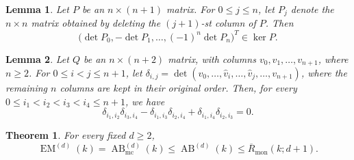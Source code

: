 \documentclass[10pt,a4paper]{amsart}
\newtheorem{theorem}{Theorem}
\newtheorem{lemma}{Lemma}
\begin{document}
\begin{lemma}\label{lem:cramer}
Let $P$ be an $n\times(n+1)$ matrix. For $0\le j\le n$, let $P_j$ denote the
$n\times n$ matrix obtained by deleting the $(j+1)$-st column of $P$. Then
\[
\bigl(\det P_0,-\det P_1,\ldots,(-1)^n\det P_n\bigr)^T\in \ker P.
\]
\end{lemma}

\begin{lemma}\label{lem:Plucker}
Let \(Q\) be an \(n\times(n+2)\) matrix, with columns $v_0,v_1,\ldots,v_{n+1}$, where \(n\geq 2\). For \(0\leq i<j\leq n+1\), let $\delta_{i,j}
  =
  \det(v_0,\ldots,\widehat v_i,\ldots,\widehat v_j,\ldots,v_{n+1})$, where the remaining \(n\) columns are kept in their original order. Then, for every $0\leq i_1<i_2<i_3<i_4\leq n+1$, we have
\begin{equation}\label{eq:plucker}
  \delta_{i_1,i_2}\delta_{i_3,i_4}
  -
  \delta_{i_1,i_3}\delta_{i_2,i_4}
  +
  \delta_{i_1,i_4}\delta_{i_2,i_3}
  =
  0.
\end{equation}
\end{lemma}

\begin{theorem}\label{thm:higher-dimensional}
For every fixed $d\ge 2$,
\[
\operatorname{EM}^{(d)}(k)
=
\operatorname{AB}^{(d)}_{\mathrm{mc}}(k)
\le
\operatorname{AB}^{(d)}(k)
\le
\overline R_{\mathrm{mon}}(k;d+1).
\]
\end{theorem}
\end{document}
